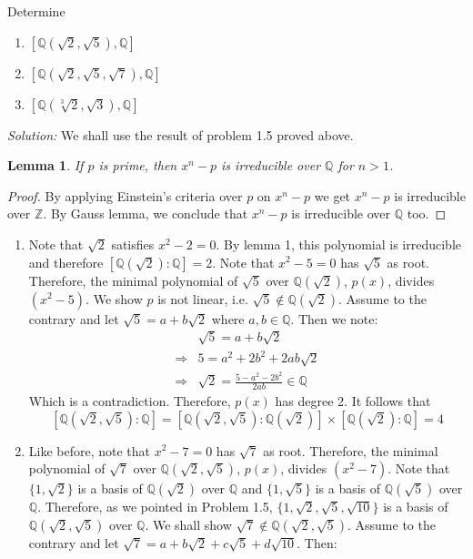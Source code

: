 \documentclass[a4paper, 11pt]{article}
\newenvironment{solution}
    {\textit{Solution:}}
    {}
\newtheorem{lemma}[theorem]{Lemma}
\begin{document}
\begin{tcolorbox}[colback=c2,colframe=c1,title=Problem 1.1]
    Determine
\begin{enumerate}
    \item $[\mathbb{Q}(\sqrt2,\sqrt5),\mathbb{Q}]$
    \item $[\mathbb{Q}(\sqrt2,\sqrt5,\sqrt7),\mathbb{Q}]$
    \item $[\mathbb{Q}(\sqrt[3]2,\sqrt3),\mathbb{Q}]$
\end{enumerate}
\end{tcolorbox}\noindent
\begin{solution}
    We shall use the result of problem 1.5 proved above. 
\begin{lemma}
    If $p$ is prime, then $x^n-p$ is irreducible over $\mathbb Q$ for $n>1$.
\end{lemma}
\begin{proof}
    By applying Einstein's criteria over $p$ on $x^n-p$ we get $x^n-p$ is irreducible over $\mathbb Z$. By Gauss lemma, we conclude that $x^n-p$ is irreducible over $\mathbb Q$ too.
\end{proof}
\begin{enumerate}
    \item Note that $\sqrt 2$ satisfies $x^2-2=0$. By lemma 1, this polynomial is irreducible and therefore $[\mathbb Q(\sqrt 2):\mathbb Q]=2$. Note that $x^2-5=0$ has $\sqrt 5$ as root. Therefore, the minimal polynomial  of $\sqrt 5$ over $\mathbb Q(\sqrt 2)$, $p(x)$, divides $(x^2-5)$. We show $p$ is not linear, i.e. $\sqrt5\notin\mathbb Q(\sqrt2)$. Assume to the contrary and let $\sqrt 5=a+b\sqrt 2$ where $a,b\in\mathbb Q$. Then we note:
    \begin{align*}
        &\sqrt 5=a+b\sqrt 2\\
        \Rightarrow&5=a^2+2b^2+2ab\sqrt2\\
        \Rightarrow&\sqrt2=\frac{5-a^2-2b^2}{2ab}\in\mathbb{Q}
    \end{align*}
    Which is a contradiction. Therefore, $p(x)$ has degree 2. It follows that
    $$[\mathbb Q(\sqrt 2,\sqrt5):\mathbb Q]=[\mathbb Q(\sqrt 2,\sqrt5):\mathbb Q(\sqrt 2)]\times [\mathbb Q(\sqrt 2):\mathbb Q]=4$$
    \item Like before, note that $x^2-7=0$ has $\sqrt 7$ as root. Therefore, the minimal polynomial  of $\sqrt 7$ over $\mathbb Q(\sqrt 2,\sqrt 5)$, $p(x)$, divides $(x^2-7)$. Note that $\{1,\sqrt 2\}$ is a basis of $\mathbb Q(\sqrt 2)$ over $\mathbb Q$ and $\{1,\sqrt 5\}$ is a basis of $\mathbb Q(\sqrt 5)$ over $\mathbb Q$. Therefore, as we pointed in Problem 1.5, $\{1,\sqrt2,\sqrt5,\sqrt{10}\}$ is a basis of $\mathbb Q(\sqrt 2,\sqrt5)$ over $\mathbb Q$. We shall show $\sqrt 7\notin \mathbb Q(\sqrt 2,\sqrt 5)$. Assume to the contrary and let $\sqrt{7}=a+b\sqrt2+c\sqrt5+d\sqrt{10}$. Then:

\end{enumerate}
\end{solution}
\end{document}
